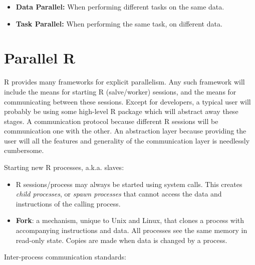 \documentclass[]{book}
\providecommand{\tightlist}{%
  \setlength{\itemsep}{0pt}\setlength{\parskip}{0pt}}
\theoremstyle{definition}
\theoremstyle{definition}
\theoremstyle{definition}
\theoremstyle{remark}
\begin{document}
\begin{itemize}
\tightlist
\item
  \textbf{Data Parallel:} When performing different tasks on the same data.
\item
  \textbf{Task Parallel:} When performing the same task, on different data.
\end{itemize}

\hypertarget{parallel-r}{%
\section{Parallel R}\label{parallel-r}}

R provides many frameworks for explicit parallelism.
Any such framework will include the means for starting R (salve/worker) sessions, and the means for communicating between these sessions.
Except for developers, a typical user will probably be using some high-level R package which will abstract away these stages.
A communication protocol because different R sessions will be communication one with the other. An abstraction layer because providing the user will all the features and generality of the communication layer is needlessly cumbersome.

Starting new R processes, a.k.a. slaves:

\begin{itemize}
\item
  R sessions/process may always be started using system calls. This creates \emph{child processes}, or \emph{spawn processes} that cannot access the data and instructions of the calling process.
\item
  \textbf{Fork}: a mechanism, unique to Unix and Linux, that clones a process with accompanying instructions and data. All processes see the same memory in read-only state. Copies are made when data is changed by a process.
\end{itemize}

Inter-process communication standards:
\end{document}
